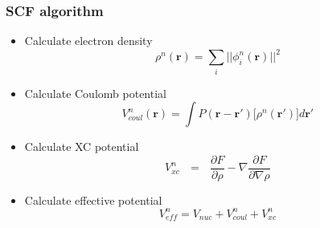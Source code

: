 \documentclass[slides]{beamer}
\begin{document}

\begin{frame}
    \frametitle{SCF algorithm}
    \begin{itemize}
	\pause
	\item Calculate electron density
	    \begin{equation}
		\nonumber
		\rho^n(\boldsymbol{r}) = \sum_i ||\phi^n_i(\boldsymbol{r})||^2
	    \end{equation}
	\pause
	\item Calculate Coulomb potential
	    \begin{equation}
		\nonumber
		V^n_{coul}(\boldsymbol{r}) = 
		\int P(\boldsymbol{r} - \boldsymbol{r}') 
		\Big[ \rho^n(\boldsymbol{r}')\Big] d\boldsymbol{r}'
	    \end{equation}
	\pause
	\item Calculate XC potential
	    \begin{equation}
		\nonumber
		V^n_{xc} \ \ \ = \ \ \ \frac{\partial F}{\partial \rho} - 
		    \nabla \frac{\partial F}{\partial \nabla \rho}
	    \end{equation}
	\pause
	\item Calculate effective potential
	    \begin{equation}
		\nonumber
		V^n_{eff} = V_{nuc} + V^n_{coul} + V^n_{xc}
	    \end{equation}
    \end{itemize}
\end{frame}
\end{document}
